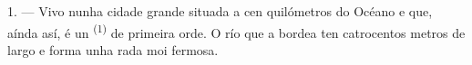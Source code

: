 %
%
%
%

\VUsaut{2.0mm}
\VUsaut{3.0mm}
\VUfilet{16mm}
\VUsaut{5.6mm}
\VUsaut{1.4mm}
\VUsaut{2.2mm}

\VUsaut{3.0mm}

1. --- Vivo nunha cidade grande situada a cen quilómetros do Océano e que, aínda así,
é un  \textsuperscript{(1)} de primeira orde. O río que a bordea ten
catrocentos metros de largo e forma unha rada moi fermosa.

